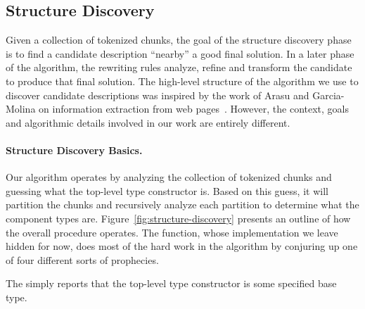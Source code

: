  




\subsection {Structure Discovery}

Given a collection of tokenized chunks, the goal of the structure
discovery phase is to find a candidate description ``nearby'' a good
final solution.  In a later phase of the algorithm, the rewriting rules 
analyze, refine
and transform the candidate to produce that final solution.  The
high-level structure of the algorithm we use to discover candidate
descriptions was inspired by the work of Arasu and
Garcia-Molina on information extraction from web pages~\cite{arasu+:sigmod03}.
However, the context, goals and algorithmic details involved in our
work are entirely different.


\paragraph*{Structure Discovery Basics.}
Our algorithm operates by analyzing the collection of tokenized chunks
and guessing what the top-level type constructor is.  Based on this guess,
it will partition the chunks and recursively analyze each partition
to determine what the component types are.
Figure~\ref{fig:structure-discovery} presents an outline of how the
overall procedure operates.  The  function,
whose implementation we leave hidden for now,
does most of the hard work in the algorithm by conjuring up 
one of four different sorts of prophecies.  

The  simply reports that the top-level type
constructor is some specified base type.

